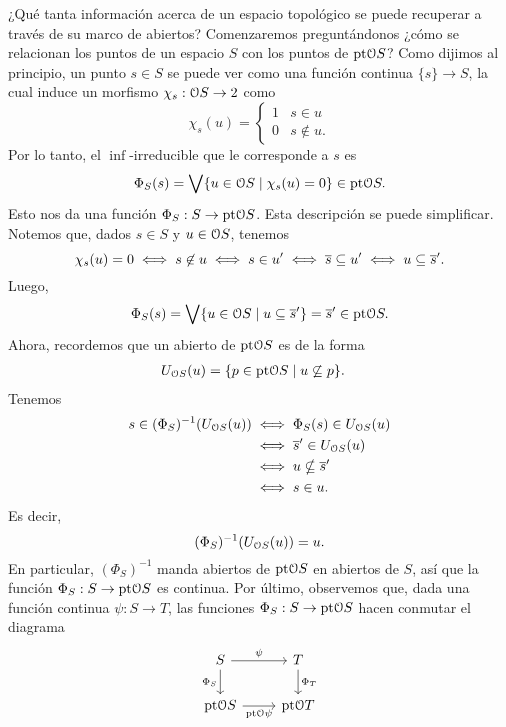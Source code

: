 ¿Qué tanta información acerca de un espacio topológico se
puede recuperar a través de su marco de abiertos?
Comenzaremos preguntándonos
¿cómo se relacionan los puntos de un espacio $S$ con los puntos de
$\pt\cal OS$?
Como dijimos al principio, un punto $s\in S$ se puede ver como una
función continua $\{s\}\to S$, la cual induce un morfismo
$\chi_s:\cal O S \to 2$ como
\begin{equation}
  \chi_s(u) =
  \begin{cases}
    1 & s\in u  \\
    0 & s\not\in u.
  \end{cases}
\end{equation}
Por lo tanto, el $\inf$-irreducible que le corresponde a $s$ es
\begin{equation}
  \Phi_S(s) = \Sup\{u\in\cal OS\mid \chi_s(u)=0\} \in \pt\cal O S
.\end{equation}
Esto nos da una función $\Phi_S:S\to\pt\cal OS$. Esta descripción
se puede simplificar. Notemos que, dados $s\in S$ y $u\in\cal OS$, tenemos
\[
  \chi_s(u) = 0
  \iff
  s\not\in u
  \iff
  s\in u'
  \iff
  \ol s \subseteq u'
  \iff
  u \subseteq {\ol s}'.
\]
Luego,
\begin{equation}
  \Phi_S(s)
  =
  \Sup\{u\in\cal OS\mid u\subseteq {\ol s}'\}
  =
  {\ol s}'
  \in
  \pt\cal OS
.\end{equation}
Ahora, recordemos que un abierto de $\pt\cal OS$ es de la forma
\begin{align*}
  U_{\cal OS}(u)
  &= \{p\in\pt\cal OS \mid u\not\subseteq p\}
.\end{align*}
Tenemos
\begin{align*}
    s\in (\Phi_S)^{-1}(U_{\cal OS}(u))
    &\iff \Phi_S(s) \in U_{\cal OS}(u) \\
    &\iff {\ol s}' \in U_{\cal OS}(u) \\
    &\iff u \nsubseteq {\ol s}' \\
    &\iff s\in u.
\end{align*}
Es decir,
\[
  (\Phi_S)^{-1}(U_{\cal OS}(u)) = u
.\]
En particular, $(\Phi_S)^{-1}$ manda abiertos de $\pt\cal OS$ en
abiertos de $S$, así que la función $\Phi_S:S\to\pt\cal OS$ es continua.
Por último, observemos que, dada una función continua $\psi:S\to T$,
las funciones $\Phi_S:S\to\pt\cal OS$ hacen conmutar el diagrama
\[
    \begin{tikzcd}
        S \ar[r,"\psi"] \ar[d,"\Phi_S"'] & T \ar[d,"\Phi_T"] \\
        \pt\cal OS \ar[r,"\pt\cal O\psi"'] & \pt\cal OT
    \end{tikzcd}
\]
